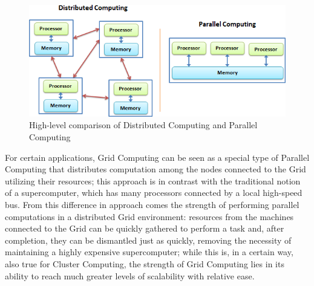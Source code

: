 \vspace{5mm}
\begin{figure}[!ht]
    \centering
    \includegraphics[width=\linewidth]{document/chapters/chapter_1/images/distributed_computing_vs_parallel_computing.png}
    \caption{High-level comparison of Distributed Computing and Parallel Computing \cite{distributed_vs_parallel}}
    \label{fig:distributed_vs_parallel}
\end{figure}
\vspace{2mm}

For certain applications, Grid Computing can be seen as a special type of Parallel Computing that distributes computation among the nodes connected to the Grid utilizing their resources; this approach is in contrast with the traditional notion of a supercomputer, which has many processors connected by a local high-speed bus.
From this difference in approach comes the strength of performing parallel computations in a distributed Grid environment: resources from the machines connected to the Grid can be quickly gathered to perform a task and, after completion, they can be dismantled just as quickly, removing the necessity of maintaining a highly expensive supercomputer; while this is, in a certain way, also true for Cluster Computing, the strength of Grid Computing lies in its ability to reach much greater levels of scalability with relative ease. 

